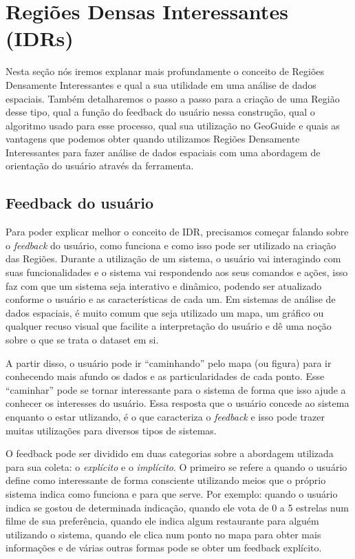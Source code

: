 \chapter{Regiões Densas Interessantes (IDRs)}

Nesta seção nós iremos explanar mais profundamente o conceito de Regiões Densamente Interessantes e qual a sua utilidade em uma análise de dados espaciais. Também detalharemos o passo a passo para a criação de uma Região desse tipo, qual a função do feedback do usuário nessa construção, qual o algoritmo usado para esse processo, qual sua utilização no GeoGuide e quais as vantagens que podemos obter quando utilizamos Regiões Densamente Interessantes para fazer análise de dados espaciais com uma abordagem de orientação do usuário através da ferramenta.

\section{Feedback do usuário}

Para poder explicar melhor o conceito de IDR, precisamos começar falando sobre o \textit{feedback} do usuário, como funciona e como isso pode ser utilizado na criação das Regiões. Durante a utilização de um sistema, o usuário vai interagindo com suas funcionalidades e o sistema vai respondendo aos seus comandos e ações, isso faz com que um sistema seja interativo e dinâmico, podendo ser atualizado conforme o usuário e as características de cada um. Em sistemas de análise de dados espaciais, é muito comum que seja utilizado um mapa, um gráfico ou qualquer recuso visual que facilite a interpretação do usuário e dê uma noção sobre o que se trata o dataset em si.

A partir disso, o usuário pode ir ``caminhando'' pelo mapa (ou figura) para ir conhecendo mais afundo os dados e as particularidades de cada ponto. Esse ``caminhar'' pode se tornar interessante para o sistema de forma que isso ajude a conhecer os interesses do usuário. Essa resposta que o usuário concede ao sistema enquanto o estar utlizando, é o que caracteriza o \textit{feedback} e isso pode trazer muitas utilizações para diversos tipos de sistemas.

O feedback pode ser dividido em duas categorias sobre a abordagem utilizada para sua coleta: o \textit{explícito} e o \textit{implícito}. O primeiro se refere a quando o usuário define como interessante de forma consciente utilizando meios que o próprio sistema indica como funciona e para que serve. Por exemplo: quando o usuário indica se gostou de determinada indicação, quando ele vota de 0 a 5 estrelas num filme de sua preferência, quando ele indica algum restaurante para alguém utilizando o sistema, quando ele clica num ponto no mapa para obter mais informações e de várias outras formas pode se obter um feedback explícito.

